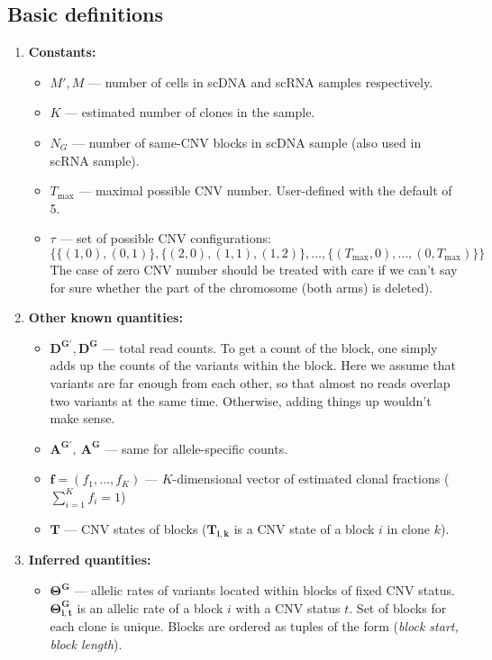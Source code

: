\documentclass[11pt,a4paper,fullpage]{article}
\theoremstyle{definition}
\theoremstyle{definition}
\theoremstyle{definition}
\numberwithin{equation}{section}
\begin{document}
	\subsection{Basic definitions}
	\begin{enumerate}
		\item \textbf{Constants:}
		\begin{itemize}
			\item $ M', M $ — number of cells in scDNA and scRNA samples respectively.
			\item $ K $  — estimated number of clones in the sample.
			\item $ N_{G} $ — number of same-CNV blocks in scDNA sample (also used in scRNA sample).
			\item $ T_{\max} $ — maximal possible CNV number. User-defined with the default of 5.
			\item $ \tau $ — set of possible CNV configurations: 
			$$\{\{ (1, 0), (0, 1) \}, \{ (2, 0), (1, 1), (1, 2) \}, \ldots, \{(T_{\max}, 0), \ldots, (0, T_{\max})  \} \}$$ The case of zero CNV number should be treated with care if we can't say for sure whether the part of the chromosome (both arms) is deleted).
		\end{itemize}
		\item \textbf{Other known quantities:}
		\begin{itemize}
			\item $ \mathbf{D^{G'}}, \mathbf{D^{G}} $ — total read counts. To get a count of the block, one simply adds up the counts of the variants within the block. Here we assume that variants are far enough from each other, so that almost no reads overlap two variants at the same time. Otherwise, adding things up wouldn't make sense.
			\item $ \mathbf{A^{G'}},\ \mathbf{A^{G}} $ — same for allele-specific counts.
			\item $ \textbf{f} = (f_1, \ldots, f_K)$ — $K$-dimensional vector of estimated clonal fractions ($ \sum_{i=1}^{K} f_i = 1 $) 
			\item $ \mathbf{T} $ — CNV states of blocks ($\mathbf{T_{i,k}}$ is a CNV state of a block $ i $ in clone $ k $).
		\end{itemize}
		\item \textbf{Inferred quantities:}
		\begin{itemize}
			\item $ \mathbf{\Theta^{G}} $ — allelic rates of variants located within blocks of fixed CNV status. $ \mathbf{\Theta^{G}_{i,t}} $ is an allelic rate of a block $i$ with a CNV status $t$. Set of blocks for each clone is unique. Blocks are ordered as tuples of the form (\textit{block start, block length}).

\end{itemize}
\end{enumerate}
\end{document}
